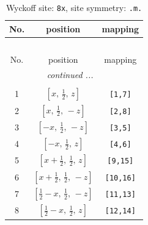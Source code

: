 \documentclass[fleqn,8pt]{jsarticle}
\begin{document}
\begin{longtable}{ccc}
\caption{Wyckoff site: {\tt 8x}, site symmetry: {\tt .m.}}
 \\
 \hline \hline
No. & position & mapping \\ \hline \endfirsthead

\multicolumn{2}{l}{\tablename\ \thetable{}} \\
 \hline \hline
No. & position & mapping \\ \hline \endhead

 \hline \hline
\multicolumn{2}{r}{\footnotesize\it continued ...} \\ \endfoot

 \hline \hline
\multicolumn{2}{r}{} \\ \endlastfoot

1 & $\left[ x,\, \frac{1}{2},\, z \right]$ & {\tt [1,7]} \\ \hline
2 & $\left[ x,\, \frac{1}{2},\, - z \right]$ & {\tt [2,8]} \\ \hline
3 & $\left[ - x,\, \frac{1}{2},\, - z \right]$ & {\tt [3,5]} \\ \hline
4 & $\left[ - x,\, \frac{1}{2},\, z \right]$ & {\tt [4,6]} \\ \hline
5 & $\left[ x + \frac{1}{2},\, \frac{1}{2},\, z \right]$ & {\tt [9,15]} \\ \hline
6 & $\left[ x + \frac{1}{2},\, \frac{1}{2},\, - z \right]$ & {\tt [10,16]} \\ \hline
7 & $\left[ \frac{1}{2} - x,\, \frac{1}{2},\, - z \right]$ & {\tt [11,13]} \\ \hline
8 & $\left[ \frac{1}{2} - x,\, \frac{1}{2},\, z \right]$ & {\tt [12,14]} \\
\end{longtable}
\renewcommand{\arraystretch}{1.2}
\end{document}
